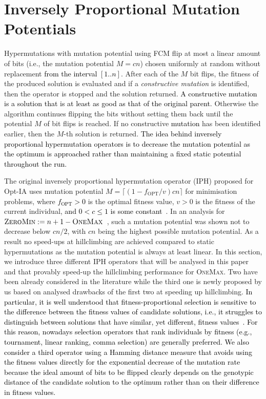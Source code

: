 \documentclass[lettersize,journal]{IEEEtran}
\newcommand{\new}[1]{\textcolor{black}{#1}}
\newcommand{\rev}[1]{\textcolor{black}{#1}}
\newcommand{\rerev}[1]{\textcolor{black}{#1}}
\newcommand{\IPHfcm}{IPH}
\begin{document}
 \section{Inversely Proportional Mutation Potentials} Hypermutations with mutation potential using FCM flip at most a linear amount of bits (i.e., the mutation potential $M=cn$) chosen uniformly at random without replacement \new{from the interval $[1..n]$}. After each of the $M$ bit flips, the fitness of the produced solution is evaluated and if a {\it constructive mutation} is identified, then the operator is stopped and the solution returned. \new{A  constructive mutation is a solution that is at least as good as that of the original parent.}
 Otherwise the algorithm continues flipping the bits without setting them back until the potential $M$ of bit flips is reached. If no constructive \new{mutation} has been identified earlier, then the $M$-th solution is returned.  
\rerev{The idea behind inversely proportional hypermutation operators is to decrease the mutation potential as the optimum is approached rather than maintaining a fixed static potential throughout the run.}

The original inversely proportional hypermutation operator (\IPHfcm{}) proposed for Opt-IA uses mutation potential  $M=\lceil(1-f_{\text{OPT}}/v)cn\rceil $ for minimisation problems, where \rerev{$f_{\text{OPT}} > 0$} is the optimal fitness value, $v>0$ is the fitness of the current individual, 
 \new{and $0<c\leq 1$ is some constant}~\cite{CutelloNicosiaPavoneTimmis2007,JansenZarges2011}. 
In an analysis for \rev{$\textsc{ZeroMin}:=n+1-\textsc {OneMax}$}~\cite{JansenZarges2011}, such a mutation potential was shown not to decrease below $cn/2$, with $cn$ being the highest possible mutation potential.
 	As a result no speed-ups at hillclimbing are achieved compared to static hypermutations as the mutation potential is always at least linear.
 In this section, we introduce three different IPH operators  that will be analysed in this paper and that provably speed-up the hillclimbing  performance for \textsc{OneMax}. Two have been already considered in the literature while the third one is newly proposed by us based on analysed drawbacks of the first two at speeding up hillclimbing.
 \rerev{In particular, it is well understood that fitness-proportional selection is sensitive to the difference between the fitness values of candidate solutions, i.e., it struggles to distinguish between solutions that have similar, yet different, fitness values~\cite{OlivetoWittTCS2014,OlivetoWitt2015,Whitley1989,NeumannOlivetoWitt2009}. For this reason, nowadays selection operators that rank individuals by fitness (e.g., tournament, linear ranking, comma selection) are generally preferred. We also consider a  third operator using a Hamming distance measure  that  avoids using the fitness values directly for the exponential decrease of the mutation rate because the ideal amount of bits to be flipped clearly depends on the genotypic distance of the candidate solution to the optimum rather than on their difference in fitness values.}
 	 
\end{document}
